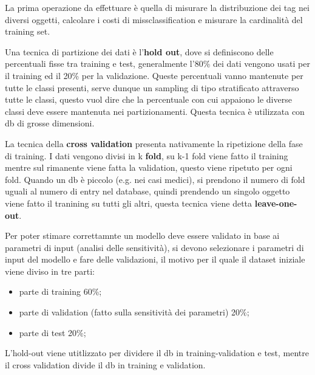 \documentclass[12pt]{article}
\begin{document}
La prima operazione da effettuare \`e quella di misurare la distribuzione dei tag nei diversi oggetti, calcolare i costi di missclassification e misurare la cardinalit\`a del training set.

Una tecnica di partizione dei dati \`e l'\textbf{hold out}, dove si definiscono delle percentuali fisse tra training e test, generalmente l'80\% dei dati vengono usati per il training ed il 20\% per la validazione. Queste percentuali vanno mantenute per tutte le classi presenti, serve dunque un sampling di tipo stratificato attraverso tutte le classi, questo vuol dire che la percentuale con cui appaiono le diverse classi deve essere mantenuta nei partizionamenti. Questa tecnica \`e utilizzata con db di grosse dimensioni.

La tecnica della \textbf{cross validation} presenta nativamente la ripetizione della fase di training. I dati vengono divisi in k \textbf{fold}, su k-1 fold viene fatto il training mentre sul rimanente viene fatta la validation, questo viene ripetuto per ogni fold. Quando un db \`e piccolo (e.g. nei casi medici), si prendono il numero di fold uguali al numero di entry nel database, quindi prendendo un singolo oggetto viene fatto il tranining su tutti gli altri, questa tecnica viene detta \textbf{leave-one-out}.

Per poter stimare correttamnte un modello deve essere validato in base ai parametri di input (analisi delle sensitivit\`a), si devono selezionare i parametri di input del modello e fare delle validazioni, il motivo per il quale il dataset iniziale viene diviso in tre parti:
\begin{itemize}
    \item parte di training 60\%;
    \item parte di validation (fatto sulla sensitivit\`a dei parametri) 20\%;
    \item parte di test 20\%;
\end{itemize}
L'hold-out viene utitlizzato per dividere il db in training-validation e test, mentre il cross validation divide il db in training e validation.
\end{document}
